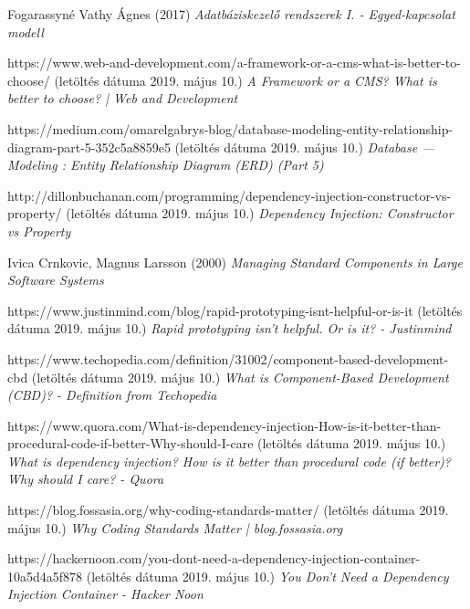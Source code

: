 \documentclass[a4paper,12pt,oneside]{report}
\begin{document}
\newpage
\pagestyle{empty}
\renewcommand{\bibsection}{\section*{  \textbf{\textit{Irodalomjegyzék}}   }}
\begin{thebibliography}{99}

		Fogarassyné Vathy Ágnes (2017)
		{\em Adatbáziskezelő rendszerek I. - Egyed-kapcsolat modell}

		https://www.web-and-development.com/a-framework-or-a-cms-what-is-better-to-choose/
		(letöltés dátuma 2019. május 10.)
		{\em A Framework or a CMS? What is better to choose? | Web and Development}

		https://medium.com/omarelgabrys-blog/database-modeling-entity-relationship-diagram-part-5-352c5a8859e5
		(letöltés dátuma 2019. május 10.)
		{\em Database — Modeling : Entity Relationship Diagram (ERD) (Part 5)}

		http://dillonbuchanan.com/programming/dependency-injection-constructor-vs-property/
		(letöltés dátuma 2019. május 10.)
		{\em Dependency Injection: Constructor vs Property}

		Ivica Crnkovic, Magnus Larsson (2000)
		{\em Managing Standard Components in Large Software Systems}

		https://www.justinmind.com/blog/rapid-prototyping-isnt-helpful-or-is-it
		(letöltés dátuma 2019. május 10.)
		{\em Rapid prototyping isn’t helpful. Or is it? - Justinmind}

		https://www.techopedia.com/definition/31002/component-based-development-cbd
		(letöltés dátuma 2019. május 10.)
		{\em What is Component-Based Development (CBD)? - Definition from Techopedia}

		https://www.quora.com/What-is-dependency-injection-How-is-it-better-than-procedural-code-if-better-Why-should-I-care
		(letöltés dátuma 2019. május 10.)
		{\em What is dependency injection? How is it better than procedural code (if better)? Why should I care? - Quora}

		https://blog.fossasia.org/why-coding-standards-matter/
		(letöltés dátuma 2019. május 10.)
		{\em Why Coding Standards Matter | blog.fossasia.org}

		https://hackernoon.com/you-dont-need-a-dependency-injection-container-10a5d4a5f878
		(letöltés dátuma 2019. május 10.)
		{\em You Don’t Need a Dependency Injection Container - Hacker Noon}


\end{thebibliography}
\end{document}
